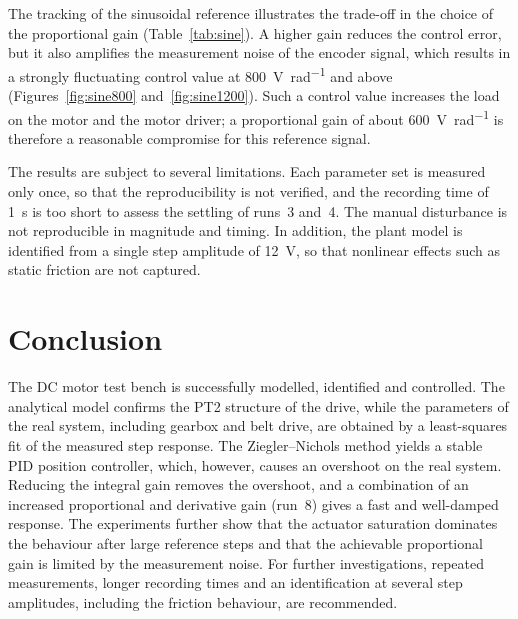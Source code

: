 The tracking of the sinusoidal reference illustrates the trade-off in the choice
of the proportional gain (Table~\ref{tab:sine}). A higher gain reduces the
control error, but it also amplifies the measurement noise of the encoder
signal, which results in a strongly fluctuating control value at
\qty{800}{\volt\per\radian} and above (Figures~\ref{fig:sine800}
and~\ref{fig:sine1200}). Such a control value increases the load on the motor
and the motor driver; a proportional gain of about \qty{600}{\volt\per\radian}
is therefore a reasonable compromise for this reference signal.

The results are subject to several limitations. Each parameter set is measured
only once, so that the reproducibility is not verified, and the recording time
of \qty{1}{\second} is too short to assess the settling of runs~3 and~4. The
manual disturbance is not reproducible in magnitude and timing. In addition, the
plant model is identified from a single step amplitude of \qty{12}{\volt}, so
that nonlinear effects such as static friction are not captured.

\section{Conclusion}\label{sec:conclusion}
The DC motor test bench is successfully modelled, identified and controlled. The
analytical model confirms the PT2 structure of the drive, while the parameters
of the real system, including gearbox and belt drive, are obtained by a
least-squares fit of the measured step response. The Ziegler--Nichols method
yields a stable PID position controller, which, however, causes an overshoot on
the real system. Reducing the integral gain removes the overshoot, and a
combination of an increased proportional and derivative gain (run~8) gives a
fast and well-damped response. The experiments further show that the actuator
saturation dominates the behaviour after large reference steps and that the
achievable proportional gain is limited by the measurement noise. For further
investigations, repeated measurements, longer recording times and an
identification at several step amplitudes, including the friction behaviour,
are recommended.

